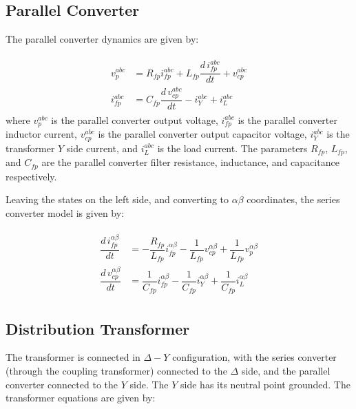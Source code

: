 \subsection{Parallel Converter}

The parallel converter dynamics are given by:

\begin{align}
    \begin{aligned}
        v_p^{abc} &= R_{fp}i_{fp}^{abc} + L_{fp}\dfrac{d\,i_{fp}^{abc}}{dt} + v_{cp}^{abc} \\
        i_{fp}^{abc} &= C_{fp}\dfrac{d\,v_{cp}^{abc}}{dt} - i_Y^{abc} + i_L^{abc}
    \end{aligned}
\end{align}
where $v_p^{abc}$ is the parallel converter output voltage, $i_{fp}^{abc}$ is the parallel converter inductor current, $v_{cp}^{abc}$ is the parallel converter output capacitor voltage, $i_Y^{abc}$ is the transformer $Y$ side current, and $i_L^{abc}$ is the load current. The parameters $R_{fp}$, $L_{fp}$, and $C_{fp}$ are the parallel converter filter resistance, inductance, and capacitance respectively.

Leaving the states on the left side, and converting to $\alpha\beta$ coordinates, the series converter model is given by:

\begin{align}
    \begin{aligned}
        \dfrac{d\,i_{fp}^{\alpha\beta}}{dt} &= -\dfrac{R_{fp}}{L_{fp}}i_{fp}^{\alpha\beta} - \dfrac{1}{L_{fp}}v_{cp}^{\alpha\beta} + \dfrac{1}{L_{fp}}v_p^{\alpha\beta} \\
        \dfrac{d\,v_{cp}^{\alpha\beta}}{dt} &= \dfrac{1}{C_{fp}}i_{fp}^{\alpha\beta} - \dfrac{1}{C_{fp}}i_Y^{\alpha\beta} + \dfrac{1}{C_{fp}}i_L^{\alpha\beta}
    \end{aligned}
\end{align}

\subsection{Distribution Transformer}

The transformer is connected in $\Delta-Y$ configuration, with the series converter (through the coupling transformer) connected to the $\Delta$ side, and the parallel converter connected to the $Y$ side. The $Y$ side has its neutral point grounded. The transformer equations are given by:

